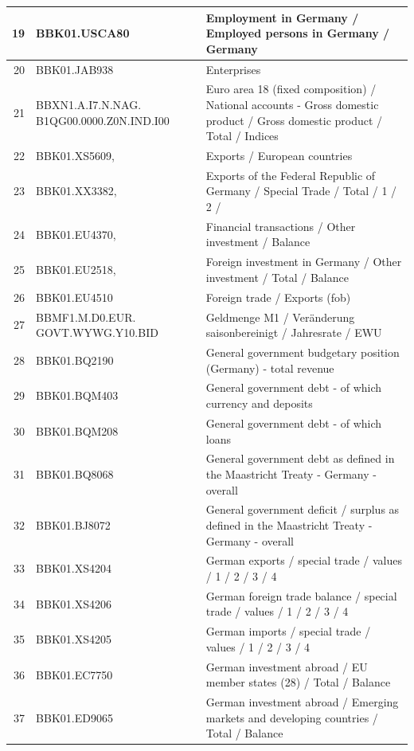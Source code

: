 \documentclass[11pt]{article}
\begin{document}
\begin{table}
\begin{tabular}{rp{5cm}p{11cm}}
  19 & BBK01.USCA80 & Employment in Germany / Employed persons in Germany / Germany \\ 
  \hline
  20 & BBK01.JAB938 & Enterprises \\ 
  \hline
  21 & BBXN1.A.I7.N.NAG. B1QG00.0000.Z0N.IND.I00 & Euro area 18 (fixed composition) / National accounts - Gross domestic product / Gross domestic product / Total / Indices \\ 
  \hline
  22 & BBK01.XS5609, & Exports / European countries \\ 
  \hline
  23 & BBK01.XX3382, & Exports of the Federal Republic of Germany / Special Trade / Total / 1 / 2 / \\ 
  \hline
  24 & BBK01.EU4370, & Financial transactions / Other investment / Balance \\ 
  \hline
  25 & BBK01.EU2518, & Foreign investment in Germany / Other investment / Total / Balance \\ 
  26 & BBK01.EU4510 & Foreign trade / Exports (fob) \\ 
  \hline
  27 & BBMF1.M.D0.EUR. GOVT.WYWG.Y10.BID & Geldmenge M1 /                                                   Veränderung saisonbereinigt / Jahresrate / EWU \\ 
  \hline
  28 & BBK01.BQ2190 & General government budgetary position (Germany) - total revenue \\ 
  \hline
  29 & BBK01.BQM403 & General government debt - of which currency and deposits \\ 
  30 & BBK01.BQM208 & General government debt - of which loans \\ 
  \hline
  31 & BBK01.BQ8068 & General government debt as defined in the Maastricht Treaty - Germany - overall \\ 
  \hline
  32 & BBK01.BJ8072 & General government deficit / surplus as defined in the Maastricht Treaty - Germany - overall \\ 
  \hline
  33 & BBK01.XS4204 & German exports / special trade / values / 1 / 2 / 3 / 4 \\ 
  \hline
  34 & BBK01.XS4206 & German foreign trade balance / special trade / values / 1 / 2 / 3 / 4 \\ 
  \hline
  35 & BBK01.XS4205 & German imports / special trade / values / 1 / 2 / 3 / 4 \\ 
  \hline
  36 & BBK01.EC7750 & German investment abroad / EU member states (28) / Total / Balance \\ 
  \hline
  37 & BBK01.ED9065 & German investment abroad / Emerging markets and developing countries / Total / Balance \\ 

\end{tabular}
\end{table}
\end{document}
